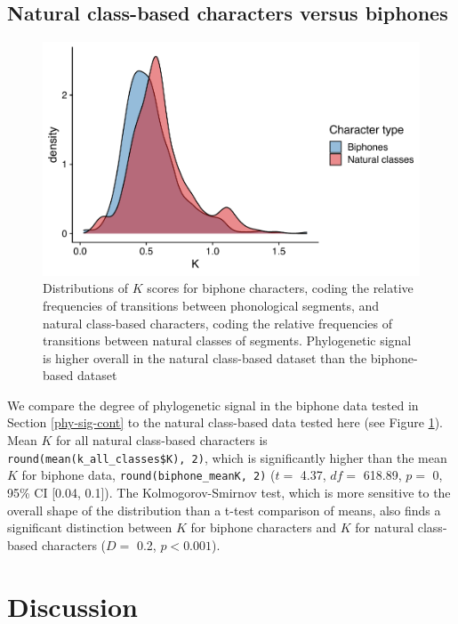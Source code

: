 \hypertarget{classes-vs-biphones}{%
\subsection{Natural class-based characters versus biphones}\label{classes-vs-biphones}}

\begin{figure}

{\centering \includegraphics[width=0.66\linewidth]{05-phylo-signal/fig/k-biphones-classes} 

}

\caption{Distributions of $K$ scores for biphone characters, coding the relative frequencies of transitions between phonological segments, and natural class-based characters, coding the relative frequencies of transitions between natural classes of segments. Phylogenetic signal is higher overall in the natural class-based dataset than the biphone-based dataset}\label{fig:k-biphones-vs-features}
\end{figure}

We compare the degree of phylogenetic signal in the biphone data tested in Section \ref{phy-sig-cont} to the natural class-based data tested here (see Figure \ref{fig:k-biphones-vs-features}). Mean \(K\) for all natural class-based characters is \texttt{round(mean(k\_all\_classes\$K),\ 2)}, which is significantly higher than the mean \(K\) for biphone data, \texttt{round(biphone\_meanK,\ 2)} (\(t=\) 4.37, \(df=\) 618.89, \(p=\) 0, 95\% CI {[}0.04, 0.1{]}). The Kolmogorov-Smirnov test, which is more sensitive to the overall shape of the distribution than a t-test comparison of means, also finds a significant distinction between \(K\) for biphone characters and \(K\) for natural class-based characters (\(D=\) 0.2, \(p < 0.001\)).

\hypertarget{discussion}{%
\section{Discussion}\label{discussion}}

